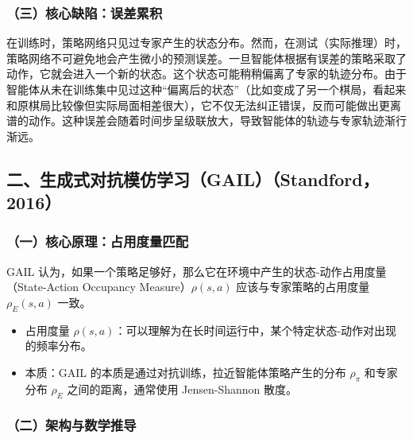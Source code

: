 \hypertarget{ux4e09ux6838ux5fc3ux7f3aux9677ux8befux5deeux7d2fux79ef}{%
\subsubsection{（三）核心缺陷：误差累积}\label{ux4e09ux6838ux5fc3ux7f3aux9677ux8befux5deeux7d2fux79ef}}

在训练时，策略网络只见过专家产生的状态分布。然而，在测试（实际推理）时，策略网络不可避免地会产生微小的预测误差。一旦智能体根据有误差的策略采取了动作，它就会进入一个新的状态。这个状态可能稍稍偏离了专家的轨迹分布。由于智能体从未在训练集中见过这种``偏离后的状态''（比如变成了另一个棋局，看起来和原棋局比较像但实际局面相差很大），它不仅无法纠正错误，反而可能做出更离谱的动作。这种误差会随着时间步呈级联放大，导致智能体的轨迹与专家轨迹渐行渐远。

\hypertarget{ux4e8cux751fux6210ux5f0fux5bf9ux6297ux6a21ux4effux5b66ux4e60gailstandford2016}{%
\subsection{二、生成式对抗模仿学习（GAIL）（Standford，2016）}\label{ux4e8cux751fux6210ux5f0fux5bf9ux6297ux6a21ux4effux5b66ux4e60gailstandford2016}}

\hypertarget{ux4e00ux6838ux5fc3ux539fux7406ux5360ux7528ux5ea6ux91cfux5339ux914d}{%
\subsubsection{（一）核心原理：占用度量匹配}\label{ux4e00ux6838ux5fc3ux539fux7406ux5360ux7528ux5ea6ux91cfux5339ux914d}}

GAIL 认为，如果一个策略足够好，那么它在环境中产生的状态-动作占用度量（State-Action Occupancy Measure）\(\rho(s,a)\) 应该与专家策略的占用度量 \(\rho_E(s,a)\) 一致。

\begin{itemize}
\tightlist
\item
  占用度量 \(\rho(s,a)\)：可以理解为在长时间运行中，某个特定状态-动作对出现的频率分布。
\item
  本质：GAIL 的本质是通过对抗训练，拉近智能体策略产生的分布 \(\rho_\pi\) 和专家分布 \(\rho_E\) 之间的距离，通常使用 Jensen-Shannon 散度。
\end{itemize}

\hypertarget{ux4e8cux67b6ux6784ux4e0eux6570ux5b66ux63a8ux5bfc}{%
\subsubsection{（二）架构与数学推导}\label{ux4e8cux67b6ux6784ux4e0eux6570ux5b66ux63a8ux5bfc}}

